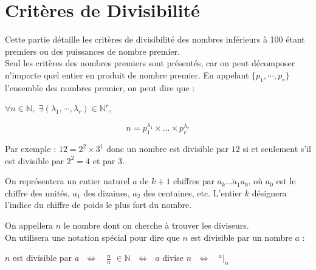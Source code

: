 \documentclass[a4paper, twoside]{article}
\begin{document}
		\vfill

	\newpage






	\section{Critères de Divisibilité}

		Cette partie détaille les critères de divisibilité des nombres inférieurs à 100 étant premiers ou des puissances de nombre premier.\\

		Seul les critères des nombres premiers sont présentés, car on peut décomposer n'importe quel entier en produit de nombre premier. En appelant $\{p_1,\cdots, p_r\}$ l'ensemble des nombres premier, on peut dire que :
		
		\begin{center}
		$ \forall n \in \mathbb{N},$  $\exists (\lambda_1, \cdots , \lambda_r) \in \mathbb{N}^r, $
		\end{center}
		{\Large $$n = p_{1}^{\lambda_1} \times \dots \times p_{r}^{\lambda_r}$$} 
		
		Par exemple : $12 = 2^2 \times 3^1$ donc un nombre est divisible par $12$ si et seulement s'il est divisible par $2^2=4$ et par $3$.\\

		\par On représentera un entier naturel $a$ de $k + 1$ chiffres par $\overline{a_k \ldots a_1 a_0}$, où $a_0$ est le chiffre des unités, $a_1$ des dizaines, $a_2$ des centaines, etc. L'entier $k$ désignera l'indice du chiffre de poids le plus fort du nombre.\\

		\par On appellera $n$ le nombre dont on cherche à trouver les diviseurs.\\
		
		On utilisera une notation spécial pour dire que $n$ est divisible par un nombre $a$ :

		\begin{center}
		$n$ est divisible par $a ~~~ \Longleftrightarrow ~~~ $ {\Large $\frac{n}{a}$} $\in \mathbb{N} ~~~ \Longleftrightarrow ~~~ a$ divise $n ~~~ \Longleftrightarrow ~~~ $ {\LARGE $^a|_n$}
		\end{center}

		\bigskip \bigskip \bigskip \bigskip 
		
\end{document}
